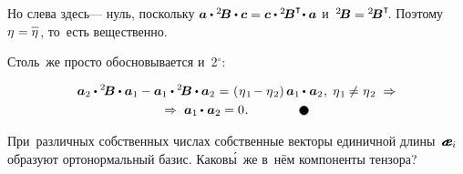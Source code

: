 \begin{otherlanguage}{russian}
\vspace{-0.16em} \noindent Но слева здесь\:--- нуль, поскольку ${\bm{a} \dotp {^2\!\bm{B}} \dotp \bm{c} = \bm{c} \dotp {^2\!\bm{B}^{\T}\!} \dotp \bm{a}}$ и~${{^2\!\bm{B}} = {^2\!\bm{B}^{\T}\!}}$. Поэтому ${\eigenvalue = \lineover{\eigenvalue}}$, то~есть вещественно.

Столь~же просто обосновывается и~2$^{\circ}$:

\nopagebreak\vspace{-0.5em}\begin{multline*}
\tikzmark{BeginEqualsZeroBrace} {\bm{a}_2 \dotp {^2\!\bm{B}} \dotp \bm{a}_1 - \bm{a}_1 \dotp {^2\!\bm{B}} \dotp \bm{a}_2} \hspace{.1ex} \tikzmark{EndEqualsZeroBrace}
= \hspace{.12ex} \left(\hspace{.1ex}{\eigenvalue_1 \hspace{-0.25ex} - \eigenvalue_2}\right) \bm{a}_1 \hspace{-0.1ex} \dotp \hspace{.1ex} \bm{a}_2 \hspace{.1ex} , \;
\eigenvalue_1 \hspace{-0.1ex} \neq \hspace{.1ex} \eigenvalue_2
\;\Rightarrow
\\
%
\Rightarrow\;
\bm{a}_1 \hspace{-0.1ex} \dotp \hspace{.1ex} \bm{a}_2 = 0
\hspace{.1ex} .
\hspace{4em} \tikz[baseline=-0.6ex] \draw [color=black, fill=black] (0, 0) circle (.8ex);
\end{multline*}

\vspace{-1.4em} При~различных собственных числах собственные векторы единичной длины~${\mathboldae_i}$ образуют ортонормальный базис. Каков\'{ы}~же в~нём компоненты тензора?


\end{otherlanguage}
